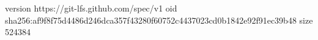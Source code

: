 version https://git-lfs.github.com/spec/v1
oid sha256:af9f8f75d4486d246dca357f43280f60752c4437023cd0b1842e92f91ec39b48
size 524384

